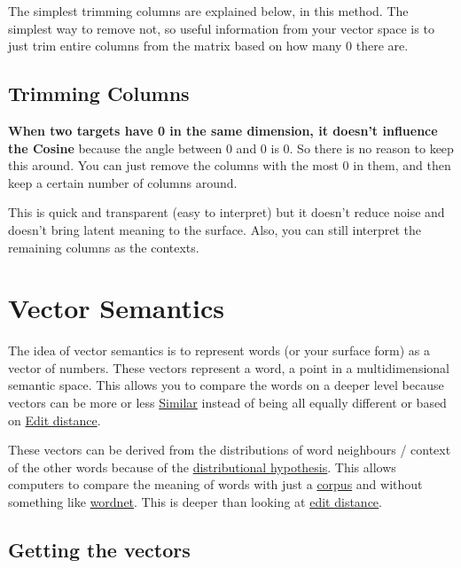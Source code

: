 \documentclass[
  11pt,
  british,
]{article}
\begin{document}
The simplest trimming columns are explained below, in this method. The
simplest way to remove not, so useful information from your vector space
is to just trim entire columns from the matrix based on how many 0 there
are.

\hypertarget{trimming-columns}{%
\subsection{Trimming Columns}\label{trimming-columns}}

\textbf{When two targets have 0 in the same dimension, it doesn't
influence the Cosine} because the angle between 0 and 0 is 0. So there
is no reason to keep this around. You can just remove the columns with
the most 0 in them, and then keep a certain number of columns around.

This is quick and transparent (easy to interpret) but it doesn't reduce
noise and doesn't bring latent meaning to the surface. Also, you can
still interpret the remaining columns as the contexts.

\hypertarget{vector-semantics}{%
\section{Vector Semantics}\label{vector-semantics}}

The idea of vector semantics is to represent words (or your surface
form) as a vector of numbers. These vectors represent a word, a point in
a multidimensional semantic space. This allows you to compare the words
on a deeper level because vectors can be more or less
\href{Similarity.md}{Similar} instead of being all equally different or
based on \href{../Languages/Edit\%20distance.md}{Edit distance}.

These vectors can be derived from the distributions of word neighbours /
context of the other words because of the
\href{Distributional\%20hypothesis.md}{distributional hypothesis}. This
allows computers to compare the meaning of words with just a
\href{../Data/Corpus.md}{corpus} and without something like
\href{../Data/Thesaurus.md}{wordnet}. This is deeper than looking at
\href{../Languages/Edit\%20distance.md}{edit distance}.

\hypertarget{getting-the-vectors}{%
\subsection{Getting the vectors}\label{getting-the-vectors}}
\end{document}
